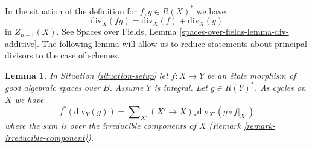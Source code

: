 \documentclass{stacks-project}
\theoremstyle{plain}
\newtheorem{lemma}[subsection]{Lemma}
\theoremstyle{definition}
\theoremstyle{remark}
\numberwithin{equation}{subsection}
\begin{document}
\noindent
In the situation of the definition for $f, g \in R(X)^*$ we have
$$
\text{div}_X(fg) = \text{div}_X(f) + \text{div}_X(g)
$$
in $Z_{n - 1}(X)$. See Spaces over Fields, Lemma
\ref{spaces-over-fields-lemma-div-additive}.
The following lemma will allow us to reduce
statements about principal divisors to the case of schemes.

\begin{lemma}
\label{lemma-etale-pullback-principal-divisor}
In Situation \ref{situation-setup} let $f : X \to Y$ be an \'etale
morphism of good algebraic spaces over $B$. Assume $Y$ is integral.
Let $g \in R(Y)^*$. As cycles on $X$ we have
$$
f^*(\text{div}_Y(g)) =
\sum\nolimits_{X'} (X' \to X)_*\text{div}_{X'}(g \circ f|_{X'})
$$
where the sum is over the irreducible components of $X$
(Remark \ref{remark-irreducible-component}).
\end{lemma}
\end{document}
